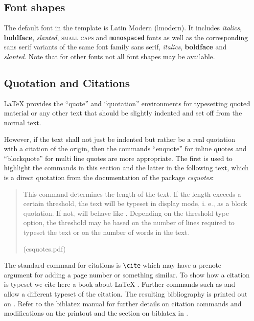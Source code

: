\subsection{Font shapes}
\label{sec:example:FontShapes}

The default font in the template is Latin Modern (lmodern). It includes \textit{italics}, \textbf{boldface}, \textsl{slanted}, \textsc{small caps} and \texttt{monospaced} fonts as well as the corresponding sans serif variants  of the same font family \textsf{sans serif}, \textsf{\textit{italics}}, \textsf{\textbf{boldface}} and \textsf{\textsl{slanted}}. Note that for other fonts not all font shapes may be available. 

\subsection{Quotation and Citations}
\label{sec:example:QuoteCite}

LaTeX provides the \enquote{quote} and \enquote{quotation} environments for typesetting quoted material or any other text that should be slightly indented 
and set off from the normal text.

However, if the text shall not just be indented but rather be a real quotation with a citation of the origin, then the commands \enquote{enquote} for inline quotes and \enquote{blockquote} for multi line quotes are more appropriate. The first is used to highlight the commands in this section and the latter in the following text, which is a direct quotation from the documentation of the package
 \emph{csquotes}: 
%
\blockquote[(csquotes.pdf)]{This command determines the length of the text. 
If the length exceeds a certain threshold, the text will be 
typeset in display mode, i. e., as a block quotation. 
If not,  will behave like . 
Depending on the threshold type option, the threshold may be based on the number
of lines required to typeset the text or on the number of words in the text.}

The standard command for citations is \texttt{\textbackslash{}cite} which may have a prenote argument for adding a page number or something similar. To show how a citation is typeset we cite here a book about LaTeX \cite[59]{companion}. Further commands such as  \parencite{companion} and  \textcite{companion} allow a different typeset of the citation. The resulting bibliography is printed out on . Refer to the biblatex manual for further details on citation commands and modifications on the printout and the section on biblatex in .

